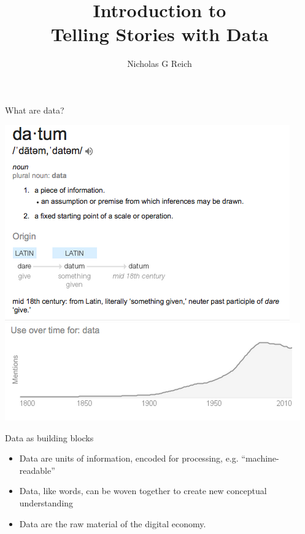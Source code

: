 \documentclass[table]{beamer}\usepackage[]{graphicx}\usepackage[]{color}
\title{Introduction to \\ Telling Stories with Data}
\author{Nicholas G Reich}
\begin{document}
\begin{frame}[plain]
	\titlepage
\end{frame}






\begin{frame}{What are data?}


\vspace{1em}

\includegraphics[width=.5\textwidth]{figure-static/data-definition.png}
\includegraphics[width=.5\textwidth]{figure-static/data-usage-over-time.png}


\begin{block}{Data as building blocks}

\begin{itemize}
	\item Data are units of information, encoded for processing, e.g. ``machine-readable''
	\item Data, like words, can be woven together to create new conceptual understanding
	\item Data are the raw material of the digital economy.
\end{itemize}

\end{block}


\end{frame}
\end{document}
